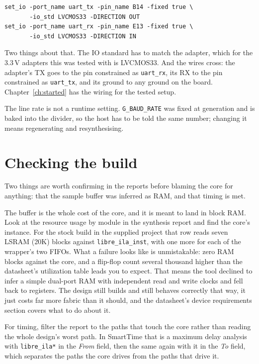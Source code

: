 \documentclass[../manual.tex]{subfiles}
\begin{document}
\begin{lstlisting}
set_io -port_name uart_tx -pin_name B14 -fixed true \
       -io_std LVCMOS33 -DIRECTION OUT
set_io -port_name uart_rx -pin_name E13 -fixed true \
       -io_std LVCMOS33 -DIRECTION IN
\end{lstlisting}

Two things about that. The IO standard has to match the adapter, which for the 3.3\,V adapters this was tested with is LVCMOS33. And the wires cross: the adapter's TX goes to the pin constrained as \texttt{uart\_rx}, its RX to the pin constrained as \texttt{uart\_tx}, and its ground to any ground on the board. Chapter~\ref{ch:started} has the wiring for the tested setup.

The line rate is not a runtime setting. \texttt{G\_BAUD\_RATE} was fixed at generation and is baked into the divider, so the host has to be told the same number; changing it means regenerating and resynthesising.

\section{Checking the build}
\label{sec:integ_check}

Two things are worth confirming in the reports before blaming the core for anything: that the sample buffer was inferred as RAM, and that timing is met.

The buffer is the whole cost of the core, and it is meant to land in block RAM. Look at the resource usage by module in the synthesis report and find the core's instance. For the stock build in the supplied project that row reads seven LSRAM (20K) blocks against \texttt{libre\_ila\_inst}, with one more for each of the wrapper's two FIFOs. What a failure looks like is unmistakable: zero RAM blocks against the core, and a flip-flop count several thousand higher than the datasheet's utilization table leads you to expect. That means the tool declined to infer a simple dual-port RAM with independent read and write clocks and fell back to registers. The design still builds and still behaves correctly that way, it just costs far more fabric than it should, and the datasheet's device requirements section covers what to do about it.

For timing, filter the report to the paths that touch the core rather than reading the whole design's worst path. In SmartTime that is a maximum delay analysis with \texttt{libre\_ila*} in the \emph{From} field, then the same again with it in the \emph{To} field, which separates the paths the core drives from the paths that drive it.
\end{document}
